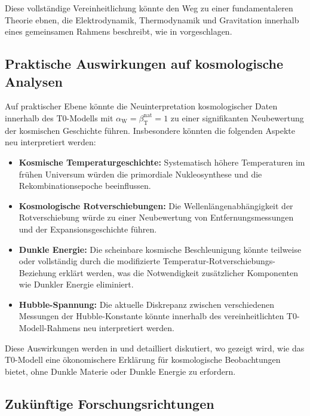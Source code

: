 \documentclass[12pt,a4paper]{article}
\newcommand{\betaT}{\beta_{\text{T}}}
\newcommand{\alphaW}{\alpha_{\text{W}}}
\begin{document}
	Diese vollständige Vereinheitlichung könnte den Weg zu einer fundamentaleren Theorie ebnen, die Elektrodynamik, Thermodynamik und Gravitation innerhalb eines gemeinsamen Rahmens beschreibt, wie in \cite{pascher_vereinheitlichung_2025} vorgeschlagen.
	
	\subsection{Praktische Auswirkungen auf kosmologische Analysen}
	\label{subsec:practical_implications}
	
	Auf praktischer Ebene könnte die Neuinterpretation kosmologischer Daten innerhalb des T0-Modells mit \(\alphaW = \betaT^{\text{nat}} = 1\) zu einer signifikanten Neubewertung der kosmischen Geschichte führen. Insbesondere könnten die folgenden Aspekte neu interpretiert werden:
	
	\begin{itemize}
		\item \textbf{Kosmische Temperaturgeschichte:} Systematisch höhere Temperaturen im frühen Universum würden die primordiale Nukleosynthese und die Rekombinationsepoche beeinflussen.
		\item \textbf{Kosmologische Rotverschiebungen:} Die Wellenlängenabhängigkeit der Rotverschiebung würde zu einer Neubewertung von Entfernungsmessungen und der Expansionsgeschichte führen.
		\item \textbf{Dunkle Energie:} Die scheinbare kosmische Beschleunigung könnte teilweise oder vollständig durch die modifizierte Temperatur-Rotverschiebungs-Beziehung erklärt werden, was die Notwendigkeit zusätzlicher Komponenten wie Dunkler Energie eliminiert.
		\item \textbf{Hubble-Spannung:} Die aktuelle Diskrepanz zwischen verschiedenen Messungen der Hubble-Konstante könnte innerhalb des vereinheitlichten T0-Modell-Rahmens neu interpretiert werden.
	\end{itemize}
	
	Diese Auswirkungen werden in \cite{pascher_messdifferenzen_2025} und \cite{pascher_galaxies_2025} detailliert diskutiert, wo gezeigt wird, wie das T0-Modell eine ökonomischere Erklärung für kosmologische Beobachtungen bietet, ohne Dunkle Materie oder Dunkle Energie zu erfordern.
	
	\subsection{Zukünftige Forschungsrichtungen}
	\label{subsec:future_research}
	
\end{document}
